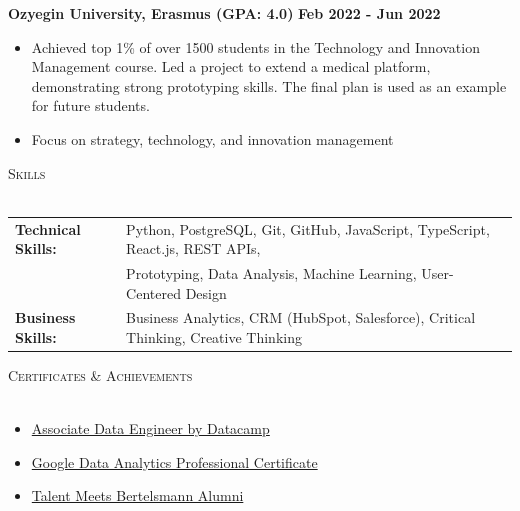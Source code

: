 \documentclass[a4paper]{article}
\newcommand{\lineunder} {
    \vspace*{-8pt} \\
    \hspace*{-18pt} \hrulefill \\
}
\newcommand{\header} [1] {
    {\hspace*{-18pt}\vspace*{6pt} \textsc{#1}}
    \vspace*{-6pt} \lineunder
}
\begin{document}
\vspace{-2mm}
\textbf{Ozyegin University, Erasmus (GPA: 4.0)}\hfill \textbf{ Feb 2022 - Jun 2022}\\
\vspace{-2mm}
\begin{itemize} \itemsep -2pt
    \item Achieved top 1\% of over 1500 students in the Technology and Innovation Management course. Led a project to extend a medical platform, demonstrating strong prototyping skills. The final plan is used as an example for future students.
	\item Focus on strategy, technology, and innovation management
\end{itemize}

\header{Skills}
\vspace{1mm}
\begin{tabular}{ l l }
	\textbf{Technical Skills:} & Python, PostgreSQL, Git, GitHub, JavaScript, TypeScript, React.js, REST APIs, \\
	\textbf{} & Prototyping, Data Analysis, Machine Learning, User-Centered Design \\
    \textbf{Business Skills:} & Business Analytics, CRM (HubSpot, Salesforce), Critical Thinking, Creative Thinking \\
\end{tabular}
\vspace{1mm}

\header{Certificates \& Achievements}
\vspace{-2mm}
\begin{itemize} \itemsep -2pt
    \item \href{https://www.datacamp.com/certificate/DEA0019349892331}{Associate Data Engineer by Datacamp}
	\item \href{https://coursera.org/share/77f44f712619905a07ce551f806c10e4}{Google Data Analytics Professional Certificate}
	\item \href{https://createyourowncareer.de/studenten/talent-meets-bertelsmann}{Talent Meets Bertelsmann Alumni}
\end{itemize}
\vspace{2mm}


\ 
\end{document}
